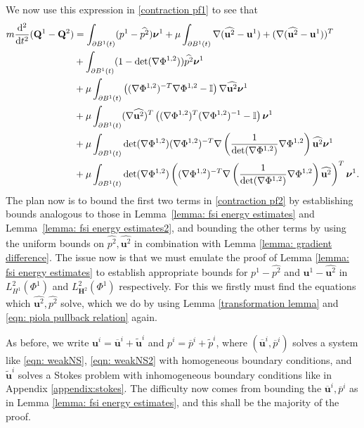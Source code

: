 \documentclass[a4paper]{amsart}
\numberwithin{equation}{section}
\newcommand{\grad}{\nabla}
\theoremstyle{plain}
\newcommand{\mbf}[1]{\mathbf{#1}}
\newcommand{\mbb}[1]{\mathbb{#1}}
\begin{document}
    We now use this expression in \eqref{contraction pf1} to see that
    \begin{align}
        m \frac{\mathrm{d}^2}{\mathrm{d}t^2}(\mbf{Q}^1 - \mbf{Q}^2) &= \int_{\partial B^1(t)} (p^1 - \widehat{p^2}) \boldsymbol{\nu}^1 + \mu \int_{\partial B^1(t)} \grad (\widehat{\mbf{u}^2} -\mbf{u}^1) + (\grad (\widehat{\mbf{u}^2} -\mbf{u}^1))^T \notag\\
        &+\int_{\partial B^1(t)} (1-\det(\grad \Phi^{1,2})) \widehat{p^2} \boldsymbol{\nu}^1\notag\\
        &+ \mu \int_{\partial B^1(t)} \left((\grad \Phi^{1,2})^{-T} \grad \Phi^{1,2} - \mbb{I}\right) \grad \widehat{\mbf{u}^2} \boldsymbol{\nu}^1\notag\\
        &+ \mu \int_{\partial B^1(t)} (\grad \widehat{\mbf{u}^2})^T\left((\grad \Phi^{1,2})^{T} (\grad \Phi^{1,2})^{-1} - \mbb{I} \right) \boldsymbol{\nu}^1 \label{contraction pf2}\\
        &+\mu \int_{\partial B^1(t)}\det(\grad\Phi^{1,2})(\grad \Phi^{1,2})^{-T}\grad \left( \frac{1}{\det(\grad\Phi^{1,2})} \grad \Phi^{1,2}\right)\widehat{\mbf{u}^2} \boldsymbol{\nu}^1\notag\\
        &+\mu \int_{\partial B^1(t)}\det(\grad\Phi^{1,2})\left((\grad \Phi^{1,2})^{-T}\grad \left( \frac{1}{\det(\grad\Phi^{1,2})} \grad \Phi^{1,2} \right)\widehat{\mbf{u}^2} \right)^T\boldsymbol{\nu}^1. \notag
    \end{align}
    The plan now is to bound the first two terms in \eqref{contraction pf2} by establishing bounds analogous to those in Lemma~\ref{lemma: fsi energy estimates} and Lemma~\ref{lemma: fsi energy estimates2}, and bounding the other terms by using the uniform bounds on $\widehat{p^2}, \widehat{\mbf{u}^2}$ in combination with Lemma \ref{lemma: gradient difference}.
    The issue now is that we must emulate the proof of Lemma \ref{lemma: fsi energy estimates} to establish appropriate bounds for $p^1 - \widehat{p^2}$ and $\mbf{u}^1 - \widehat{\mbf{u}^2}$ in $L^2_{H^1}(\Phi^1)$ and $L^2_{\mbf{H}^2}(\Phi^1)$ respectively.
    For this we firstly must find the equations which $\widehat{\mbf{u}^2}, \widehat{p^2}$ solve, which we do by using Lemma \ref{transformation lemma} and \eqref{eqn: piola pullback relation} again.

    As before, we write $\mbf{u}^i = \overline{\mbf{u}}^i + \widetilde{\mbf{u}}^i$ and $p^i = \overline{p}^i + \widetilde{p}^i$, where $(\overline{\mbf{u}}^i,\overline{p}^i)$ solves a system like \eqref{eqn: weakNS}, \eqref{eqn: weakNS2} with homogeneous boundary conditions, and $\widetilde{\mbf{u}}^i$ solves a Stokes problem with inhomogeneous boundary conditions like in Appendix \ref{appendix:stokes}.
    The difficulty now comes from bounding the $\overline{\mbf{u}}^i, \overline{p}^i$ as in Lemma \ref{lemma: fsi energy estimates}, and this shall be the majority of the proof.
\end{document}
